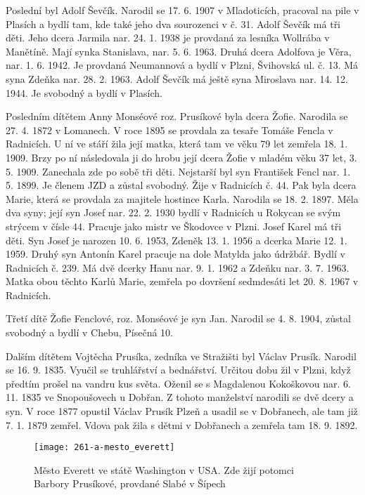 \documentclass[../dejiny-rodu-prusiku.tex]{subfiles}
\begin{document}
Poslední byl Adolf Ševčík. Narodil se 17. 6. 1907 v Mladoticích, pracoval na pile v Plasích a bydlí tam, kde také jeho dva sourozenci v č. 31. Adolf Ševčík má tři děti. Jeho dcera Jarmila nar. 24. 1. 1938 je provdaná za lesníka Wollrába v Manětíně. Mají synka Stanislava, nar. 5. 6. 1963. Druhá dcera Adolfova je Věra, nar. 1. 6. 1942. Je provdaná Neumannová a bydlí v Plzni, Švihovská ul. č. 13. Má syna Zdeňka nar. 28. 2. 1963. Adolf Ševčík má ještě syna Miroslava nar. 14. 12. 1944. Je svobodný a bydlí v Plasích.

Posledním dítětem Anny Monséové roz. Prusíkové byla dcera Žofie. Narodila se 27. 4. 1872 v Lomanech. V roce 1895 se provdala za tesaře Tomáše Fencla v Radnicích. U ní ve stáří žila její matka,  která tam ve věku 79 let zemřela 18. 1. 1909. Brzy po ní následovala ji do hrobu její dcera Žofie v mladém věku 37 let, 3. 5. 1909. Zanechala zde po sobě tři děti. Nejstarší byl syn František Fencl nar. 1. 5. 1899. Je členem JZD a zůstal svobodný. Žije v Radnicích č. 44. Pak byla dcera Marie, která se provdala za majitele hostince Karla. Narodila se 18. 2. 1897. Měla dva syny; její syn Josef nar. 22. 2. 1930 bydlí v Radnicích u Rokycan se svým strýcem v čísle 44. Pracuje jako mistr ve Škodovce v Plzni. Josef Karel má tři děti. Syn Josef je narozen 10. 6. 1953, Zdeněk 13. 1. 1956 a dcerka Marie 12. 1. 1959. Druhý syn Antonín Karel pracuje na dole Matylda jako údržbář. Bydlí v Radnicích č. 239. Má dvě dcerky Hanu nar. 9. 1. 1962 a Zdeňku nar. 3. 7. 1963. Matka obou těchto Karlů Marie, zemřela po dovršení sedmdesáti let 20. 8. 1967 v Radnicích.

Třetí dítě Žofie Fenclové, roz. Monséové je syn Jan. Narodil se 4. 8. 1904, zůstal svobodný a bydlí v Chebu, Písečná 10.

Dalším dítětem Vojtěcha Prusíka, zedníka ve Stražišti byl Václav Prusík. Narodil se 16. 9. 1835. Vyučil se truhlář­ství a bednářství. Určitou dobu žil v Plzni, když předtím
prošel na vandru kus světa. Oženil se s Magdalenou Kokoškovou nar. 6. 11. 1835 ve Snopoušovech u Dobřan. Z tohoto manželství narodili se dvě dcery a syn. V roce 1877 opustil Václav Prusík Plzeň a usadil se v Dobřanech, ale tam již 7. 1. 1879 zemřel. Vdova pak žila s dětmi v Dobřanech a zemřela tam 18. 9. 1892.

\begin{figure}
\centering
\texttt{[image: 261-a-mesto\_everett]}
\caption{Město Everett ve státě Washington v USA. Zde žijí potomci Barbory Prusíkové, provdané Slabé v Šípech}
\label{fig:261-a-mesto_everett}
\end{figure}
\end{document}
